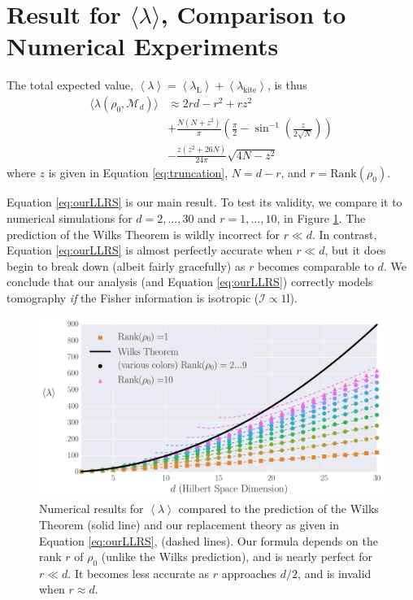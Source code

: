 \documentclass[aps,pra, twocolumn]{revtex4-1}
\newcommand{\M}{\mathcal{M}}
\newcommand{\expect}[1]{\ensuremath{\left\langle#1\right\rangle}}
\def\Id{1\!\mathrm{l}}
\newcommand{\Fi}{\mathcal{I}}
\begin{document}
\section{Result for $\langle \lambda \rangle$, Comparison to Numerical Experiments}
The total expected value, $\expect{\lambda} = \expect{\lambda_{\mathrm{L}}} + \expect{\lambda_{\mathrm{kite}}}$, is thus
\begin{align}
\label{eq:ourLLRS}
\nonumber \langle \lambda(\rho_{0}, \M_{d}) \rangle &\approx 2rd - r^{2}+rz^{2}\\
\nonumber & + \frac{N(N+z^{2})}{\pi}\left(\frac{\pi}{2} - \sin^{-1}\left(\frac{z}{2\sqrt{N}}\right)\right) \\
& - \frac{z(z^{2}+26N)}{24\pi}\sqrt{4N-z^{2}}
\end{align}
where $z$ is given in Equation \eqref{eq:truncation}, $N=d-r$, and $r = \mathrm{Rank}(\rho_{0})$.

Equation \eqref{eq:ourLLRS} is our main result.  To test its validity, we compare it to numerical simulations for $d=2,\ldots,30$ and $r=1,\ldots,10$, in Figure \ref{fig:modelcomp-iso}.  The prediction of the Wilks Theorem is wildly incorrect for $r\ll d$. In contrast, Equation \eqref{eq:ourLLRS} is almost perfectly accurate when $r \ll d$, but it does begin to break down (albeit fairly gracefully) as $r$ becomes comparable to $d$.  We conclude that our analysis (and Equation \eqref{eq:ourLLRS}) correctly models tomography \emph{if} the Fisher information is isotropic ($\Fi \propto \Id$).

\begin{figure}[h]
 \includegraphics[width=\columnwidth]{Images/Figure_5.pdf}
 \caption{Numerical results for $\expect{\lambda}$ compared to the prediction of the Wilks Theorem (solid line) and our replacement theory as given in Equation \eqref{eq:ourLLRS}, (dashed lines).  Our formula depends on the rank $r$ of $\rho_0$ (unlike the Wilks prediction), and is nearly perfect for $r\ll d$.  It becomes less accurate as $r$ approaches $d/2$, and is invalid when $r\approx d$.}
 \label{fig:modelcomp-iso}
\end{figure}
\end{document}
